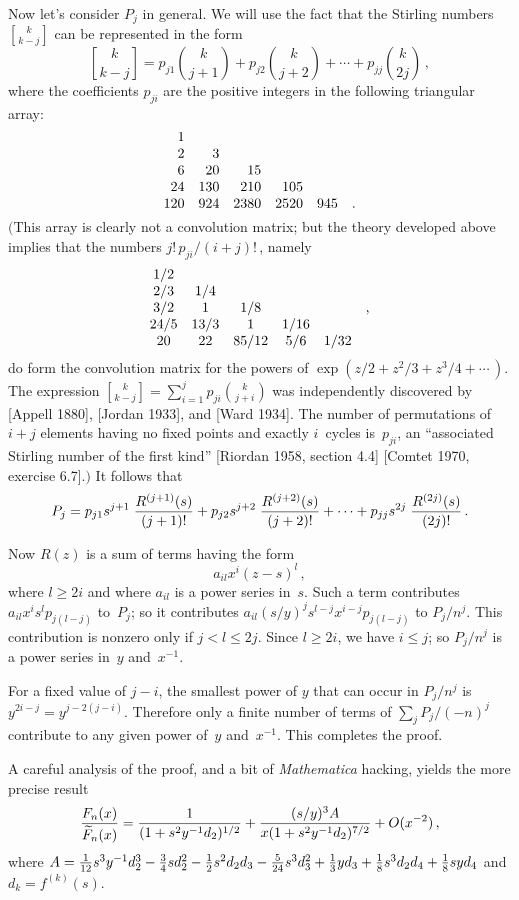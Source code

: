 Now let's consider $P_j$ in general. We will use the fact that the
Stirling numbers ${k\brack k-j}$ can be represented in the form
$${k\brack k-j}=p_{j1}{k\choose j+1}+p_{j2}{k\choose j+2}+\cdots
+p_{jj}{k\choose 2j}\,,$$
where the coefficients $p_{ji}$ are the positive integers in the
following triangular array:
$$\vcenter{\halign{\hfil$#$\quad&\hfil$#$\quad&\hfil$#$\quad
&\hfil$#$\quad&\hfil$#$\quad&\hfil$#$\cr
1\cr
2&3\cr
6&20&15\cr
24&130&210&105\cr
120&924&2380&2520&945&.\cr}}$$
$\bigl($This array is clearly not a convolution matrix; but the theory
developed above implies that the numbers $j!\,p_{ji}/(i+j)!\,$, namely
$$\vcenter{\halign{\hfil$#$\hfil\quad&\hfil$#$\hfil\quad&\hfil$#$\hfil\quad
&\hfil$#$\hfil\quad&\hfil$#$\hfil\quad&\hfil$#$\hfil\cr
1/2\cr
2/3&1/4\cr
3/2&1&1/8&&&,\cr
24/5&13/3&1&1/16\cr
20&22&85/12&5/6&1/32\cr}}$$
do form the convolution matrix for the powers of 
$\exp(z/2+z^2\!/3+z^3\!/4+\cdots\,)$.
The expression ${k\brack k-j}=\sum_{i=1}^jp_{ji}{k\choose j+i}$ was
independently discovered by [Appell 1880], [Jordan 1933], and [Ward
1934]. The number of permutations of $i+j$ elements having no fixed
points and exactly $i$~cycles is~$p_{ji}$, an ``associated Stirling
number of the first kind'' [Riordan 1958, section 4.4] 
[Comtet 1970, exercise 6.7].$\bigr)$
It follows that
$$P_j=p_{j1}s^{j+1}\;{R^{(j+1)}(s)\over
(j+1)!}+p_{j2}s^{j+2}\;{R^{(j+2)}(s)\over
(j+2)!}+\cdots+p_{jj}s^{2j}\;{R^{(2j)}(s)\over (2j)!}\,.$$

Now $R(z)$ is a sum of terms having the form
$$a_{il}x^i(z-s)^l\,,$$
where $l\geq 2i$ and where $a_{il}$ is a power series in~$s$. Such a
term contributes $a_{il}x^is^lp_{j(l-j)}$ to~$P_j$; so it contributes
$a_{il}(s/y)^js^{l-j}x^{i-j}p_{j(l-j)}$ to $P_j/n^j$. This contribution
is nonzero only if $j<l\leq 2j$. Since $l\geq 2i$, we have $i\leq j$;
so $P_j/n^j$ is a power series in~$y$ and~$x^{-1}$.

For a fixed value of $j-i$, the smallest power of $y$ that can occur in
$P_j/n^j$ is $y^{2i-j}=y^{j-2(j-i)}$. Therefore only a finite number
of terms of $\sum_jP_j/(-n)^j$ contribute to any given power of~$y$
and~$x^{-1}$. This completes the proof.

A careful analysis of the proof, and a bit of {\sl Mathematica\/}
hacking, yields the more precise result
$${F_n(x)\over \widetilde{F}_n(x)}={1\over
(1+s^2y^{-1}d_2)^{1/2}}+{(s/y)^3A\over
x(1+s^2y^{-1}d_2)^{7/2}}+O(x^{-2})\,,$$
where $A={1\over 12}s^3y^{-1}d_2^3-{3\over 4}sd_2^2-{1\over
2}s^2d_2d_3-{5\over 24}s^3d_3^2+{1\over 3}yd_3+{1\over 8}s^3d_2d_4+
{1\over 8}syd_4$ and $d_k=f^{(k)}(s)$.

